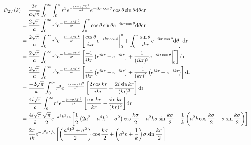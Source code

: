 \documentclass[letterpaper,twocolumn,amsmath,amssymb,prb]{revtex4-1}
\begin{document}
\begin{widetext}
\begin{align}
  \tilde{w}_{2V}(k) &= \frac{2 \pi}{a\sqrt{\pi}}\int_0^\infty \int_0^\pi r^3
  e^{-\frac{(r-\sigma/2)^2}{a^2}} e^{-ikr \cos{\theta}} \cos{\theta}
  \sin{\theta} \mathrm{d \theta dr} \\
  &= \frac{2 \sqrt{\pi}}{a}\int_0^\infty r^3
  e^{-\frac{(r-\sigma/2)^2}{a^2}} \int_0^\pi \cos{\theta}
  \sin{\theta}e^{-ikr \cos{\theta}}\mathrm{d \theta dr} \\
  &= \frac{2 \sqrt{\pi}}{a}\int_0^\infty r^3
  e^{-\frac{(r-\sigma/2)^2}{a^2}} \left[ \frac{\cos{\theta}}{ikr}
    e^{-ikr\cos{\theta}} \bigg{|}_0^\pi + \int_0^\pi
    \frac{\sin{\theta}}{ikr}e^{-ikr\cos{\theta}} \mathrm{d \theta}
    \right] \mathrm{dr} \\
  &= \frac{2 \sqrt{\pi}}{a}\int_0^\infty r^3
  e^{-\frac{(r-\sigma/2)^2}{a^2}} \left[ \frac{-1}{ikr}\left(
    e^{ikr} + e^{-ikr} \right) +
    \frac{1}{(ikr)^2}e^{-ikr\cos{\theta}} \bigg{|}_0^\pi \right]
  \mathrm{dr} \\
  &= \frac{2 \sqrt{\pi}}{a}\int_0^\infty r^3
  e^{-\frac{(r-\sigma/2)^2}{a^2}} \left[ \frac{-1}{ikr}\left(
    e^{ikr} + e^{-ikr} \right)
    +\frac{-1}{(kr)^2} \left(e^{ikr} -
    e^{-ikr}\right)\right] \mathrm{dr} \\
  &= \frac{-2 \sqrt{\pi}}{a}\int_0^\infty r^3
  e^{-\frac{(r-\sigma/2)^2}{a^2}} \left[ \frac{2\cos{kr}}{ikr}
    +\frac{2i\sin{kr}}{(kr)^2}\right] \mathrm{dr} \\
  &= \frac{4i \sqrt{\pi}}{a}\int_0^\infty r^3
  e^{-\frac{(r-\sigma/2)^2}{a^2}} \left[ \frac{\cos{kr}}{kr}
    -\frac{\sin{kr}}{(kr)^2}\right] \mathrm{dr} \\
  &= \frac{4i \sqrt{\pi}}{k} \frac{\sqrt{\pi}} {2}e^{-a^2k^2/4}\left[
    \frac{1}{2} \left(2a^2-a^4k^2-\sigma^2 \right)
    \cos{\frac{k\sigma}{2}} - a^2k\sigma \sin{\frac{k\sigma}{2}} -
    \frac{1}{k}\left( a^2k\cos{\frac{k\sigma}{2}} + \sigma
    \sin{\frac{k\sigma}{2}} \right) \right] \\
  &= \frac{2 \pi}{ik}e^{-a^2k^2/4}\left[ \left(\frac{a^4k^2 +
      \sigma^2}{2} \right) \cos{\frac{k\sigma}{2}} +
    \left(a^2k + \frac{1}{k} \right)\sigma \sin{\frac{k\sigma}{2}} \right]
\end{align}


\end{widetext}
\end{document}
